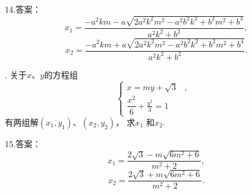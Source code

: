 \documentclass[UTF8]{ctexart}
\begin{document}
\noindent 14.答案：$$x_1=\dfrac{-a^2km-a\sqrt{2a^2k^2m^2-a^2b^2k^2+b^2m^2+b^4}}{a^2k^2+b^2},$$
     $$x_2=\dfrac{-a^2km+a\sqrt{2a^2k^2m^2-a^2b^2k^2+b^2m^2+b^4}}{a^2k^2+b^2}.$$
\newpage
    
. 关于$x$、$y$的方程组\begin{equation*}
    \left\{
    \begin{aligned}
    x=my+\sqrt{3} &,& \\
    \dfrac{x^2}{6}+\frac{y^2}{3}=1 & &
    \end{aligned}
    \right.
    \end{equation*}{\color{red}有两组解$(x_1,y_1)$、$(x_2,y_2)$，} 求$x_1$ 和$x_2$.\vspace{3cm}
    
\noindent 15.答案：$$x_1=\dfrac{2\sqrt3-m\sqrt{6m^2+6}}{m^2+2},$$
     $$x_2=\dfrac{2\sqrt3+m\sqrt{6m^2+6}}{m^2+2}.$$

    
\end{document}
